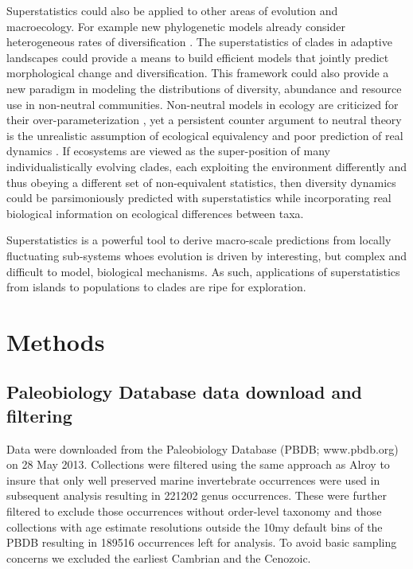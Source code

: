 \documentclass[12pt]{article}
\let\citep=\autocite
\begin{document}
Superstatistics could also be applied to other areas of evolution and
macroecology.  For example new phylogenetic models already consider
heterogeneous rates of diversification
\citep[e.g.][]{rabosky2006laser}. The superstatistics of clades in
adaptive landscapes could provide a means to build efficient models
that jointly predict morphological change and diversification. This
framework could also provide a new paradigm in modeling the
distributions of diversity, abundance and resource use in non-neutral
communities. Non-neutral models in ecology are criticized for their
over-parameterization \citep{rosindell2011}, yet a persistent
counter argument to neutral theory \citep{hubbell2001} is the
unrealistic assumption of ecological equivalency
\citep{chave2004neutral} and poor prediction of real dynamics
\citep{ricklefs2006neutral}. If ecosystems are viewed as the
super-position of many individualistically evolving clades, each
exploiting the environment differently and thus obeying a different
set of non-equivalent statistics, then diversity dynamics could be
parsimoniously predicted with superstatistics while incorporating real
biological information on ecological differences between taxa.

Superstatistics is a powerful tool to derive macro-scale predictions
from locally fluctuating sub-systems whoes evolution is driven by
interesting, but complex and difficult to model, biological
mechanisms. As such, applications of superstatistics from islands to
populations to clades are ripe for exploration.


\section*{Methods}

\subsection*{Paleobiology Database data download and filtering}
Data were downloaded from the Paleobiology Database (PBDB;
www.pbdb.org) on 28 May 2013. Collections were filtered using the same
approach as Alroy \citep{alroy08} to insure that only well preserved
marine invertebrate occurrences were used in subsequent analysis
resulting in 221202 genus occurrences. These were further filtered to
exclude those occurrences without order-level taxonomy and those
collections with age estimate resolutions outside the 10my default
bins of the PBDB resulting in 189516 occurrences left for analysis. To
avoid basic sampling concerns we excluded the earliest Cambrian and
the Cenozoic.
\end{document}
